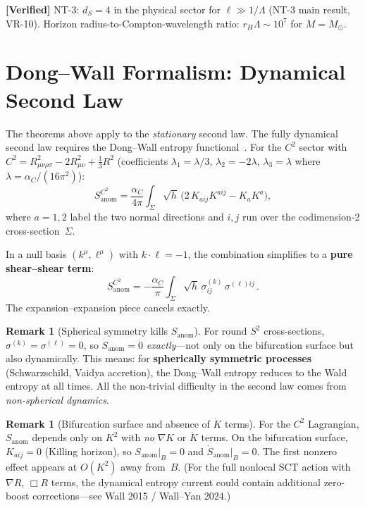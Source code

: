 \documentclass[11pt,a4paper]{article}
\newcommand{\Msun}{M_{\odot}}
\theoremstyle{plain}
\theoremstyle{definition}
\newtheorem{remark}[theorem]{Remark}
\newcommand{\verified}[1]{%
  \par\smallskip\noindent
  \colorbox{green!10}{\parbox{\dimexpr\linewidth-2\fboxsep}{%
    \textcolor{green!50!black}{\textbf{[Verified]}} #1}}%
  \par\smallskip}
\begin{document}
\verified{NT-3: $d_S = 4$ in the physical sector for
$\ell \gg 1/\Lambda$ (NT-3 main result, VR-10).  Horizon
radius-to-Compton-wavelength ratio:
$r_H \Lambda \sim 10^7$ for $M = \Msun$.}


\section{Dong--Wall Formalism: Dynamical Second Law}%
\label{sec:dong_wall}

The theorems above apply to the \emph{stationary} second law.
The fully dynamical second law requires the Dong--Wall entropy
functional~\cite{DongWall,Camps2013}.  For the $C^2$ sector with
$C^2 = R_{\mu\nu\rho\sigma}^2 - 2R_{\mu\nu}^2 + \frac{1}{3}R^2$
(coefficients $\lambda_1 = \lambda/3$, $\lambda_2 = -2\lambda$,
$\lambda_3 = \lambda$ where $\lambda = \alpha_C/(16\pi^2)$):
\begin{equation}\label{eq:S_anom}
  S_{\mathrm{anom}}^{C^2}
  = \frac{\alpha_C}{4\pi}\int_\Sigma\!\sqrt{h}\,
  \bigl(2\,K_{aij}K^{aij} - K_a K^a\bigr),
\end{equation}
where $a = 1,2$ label the two normal directions and $i,j$ run over
the codimension-2 cross-section~$\Sigma$.

In a null basis $(k^\mu, \ell^\mu)$ with $k \cdot \ell = -1$, the
combination simplifies to a \textbf{pure shear--shear term}:
\begin{equation}\label{eq:S_anom_null}
  \boxed{
  S_{\mathrm{anom}}^{C^2}
  = -\frac{\alpha_C}{\pi}\int_\Sigma\!\sqrt{h}\,
  \sigma^{(k)}_{ij}\,\sigma^{(\ell)ij}\,.
  }
\end{equation}
The expansion--expansion piece cancels exactly.

\begin{remark}[Spherical symmetry kills $S_{\mathrm{anom}}$]
  For round $S^2$ cross-sections, $\sigma^{(k)} = \sigma^{(\ell)} = 0$,
  so $S_{\mathrm{anom}} = 0$ \emph{exactly}---not only on the
  bifurcation surface but also dynamically.  This means: for
  \textbf{spherically symmetric processes} (Schwarzschild,
  Vaidya accretion), the Dong--Wall entropy reduces to the
  Wald entropy at all times.  All the non-trivial difficulty in the
  second law comes from \emph{non-spherical dynamics}.
\end{remark}

\begin{remark}[Bifurcation surface and absence of $\dot{K}$ terms]
  For the $C^2$ Lagrangian, $S_{\mathrm{anom}}$ depends only on $K^2$
  with \emph{no} $\nabla K$ or $\dot{K}$ terms.  On the bifurcation
  surface, $K_{aij} = 0$ (Killing horizon), so
  $S_{\mathrm{anom}}|_B = 0$ and $\dot{S}_{\mathrm{anom}}|_B = 0$.
  The first nonzero effect appears at $O(K^2)$ away from~$B$.
  (For the full nonlocal SCT action with $\nabla R$, $\Box R$ terms,
  the dynamical entropy current could contain additional zero-boost
  corrections---see Wall 2015 / Wall--Yan 2024.)
\end{remark}
\end{document}

